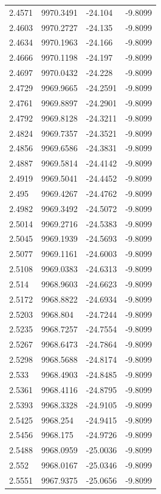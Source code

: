 \begin{table}[H]
\begin{tabular}{llll}
2.4571 & 9970.3491 & -24.104 & -9.8099 \\
2.4603 & 9970.2727 & -24.135 & -9.8099 \\
2.4634 & 9970.1963 & -24.166 & -9.8099 \\
2.4666 & 9970.1198 & -24.197 & -9.8099 \\
2.4697 & 9970.0432 & -24.228 & -9.8099 \\
2.4729 & 9969.9665 & -24.2591 & -9.8099 \\
2.4761 & 9969.8897 & -24.2901 & -9.8099 \\
2.4792 & 9969.8128 & -24.3211 & -9.8099 \\
2.4824 & 9969.7357 & -24.3521 & -9.8099 \\
2.4856 & 9969.6586 & -24.3831 & -9.8099 \\
2.4887 & 9969.5814 & -24.4142 & -9.8099 \\
2.4919 & 9969.5041 & -24.4452 & -9.8099 \\
2.495 & 9969.4267 & -24.4762 & -9.8099 \\
2.4982 & 9969.3492 & -24.5072 & -9.8099 \\
2.5014 & 9969.2716 & -24.5383 & -9.8099 \\
2.5045 & 9969.1939 & -24.5693 & -9.8099 \\
2.5077 & 9969.1161 & -24.6003 & -9.8099 \\
2.5108 & 9969.0383 & -24.6313 & -9.8099 \\
2.514 & 9968.9603 & -24.6623 & -9.8099 \\
2.5172 & 9968.8822 & -24.6934 & -9.8099 \\
2.5203 & 9968.804 & -24.7244 & -9.8099 \\
2.5235 & 9968.7257 & -24.7554 & -9.8099 \\
2.5267 & 9968.6473 & -24.7864 & -9.8099 \\
2.5298 & 9968.5688 & -24.8174 & -9.8099 \\
2.533 & 9968.4903 & -24.8485 & -9.8099 \\
2.5361 & 9968.4116 & -24.8795 & -9.8099 \\
2.5393 & 9968.3328 & -24.9105 & -9.8099 \\
2.5425 & 9968.254 & -24.9415 & -9.8099 \\
2.5456 & 9968.175 & -24.9726 & -9.8099 \\
2.5488 & 9968.0959 & -25.0036 & -9.8099 \\
2.552 & 9968.0167 & -25.0346 & -9.8099 \\
2.5551 & 9967.9375 & -25.0656 & -9.8099 \\

\end{tabular}
\end{table}
